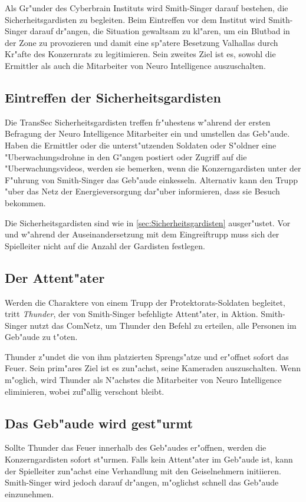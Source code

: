 Als Gr"under des Cyberbrain Instituts wird Smith-Singer darauf bestehen, die Sicherheitsgardisten zu begleiten. Beim Eintreffen vor dem Institut wird Smith-Singer darauf dr"angen, die Situation gewaltsam zu kl"aren, um ein Blutbad in der Zone zu provozieren und damit eine sp"atere Besetzung Valhallas durch Kr"afte des Konzernrats zu legitimieren. Sein zweites Ziel ist es, sowohl die Ermittler als auch die Mitarbeiter von Neuro Intelligence auszuschalten.

\subsection{Eintreffen der Sicherheitsgardisten} 
Die TransSec Sicherheitsgardisten treffen fr"uhestens w"ahrend der ersten Befragung der Neuro Intelligence Mitarbeiter ein und umstellen das Geb"aude. Haben die Ermittler oder die unterst"utzenden Soldaten oder S"oldner eine "Uberwachungsdrohne in den G"angen postiert oder Zugriff auf die "Uberwachungsvideos, werden sie bemerken, wenn die Konzerngardisten unter der F"uhrung von Smith-Singer das Geb"aude einkesseln. Alternativ kann \xl{} den Trupp "uber das Netz der Energieversorgung dar"uber informieren, dass sie Besuch bekommen.

Die Sicherheitsgardisten sind wie in \cref{sec:Sicherheitsgardisten} ausger"ustet. Vor und w"ahrend der Auseinandersetzung mit dem Eingreiftrupp muss sich der Spielleiter nicht auf die Anzahl der Gardisten festlegen.

\subsection{Der Attent"ater} 
Werden die Charaktere von einem Trupp der Protektorats-Soldaten begleitet, tritt \emph{Thunder}, der von Smith-Singer befehligte Attent"ater, in Aktion. Smith-Singer nutzt das ComNetz, um Thunder den Befehl zu erteilen, alle Personen im Geb"aude zu t"oten.

Thunder z"undet die von ihm platzierten Sprengs"atze und er"offnet sofort das Feuer. Sein prim"ares Ziel ist es zun"achst, seine Kameraden auszuschalten. Wenn m"oglich, wird Thunder als N"achstes die Mitarbeiter von Neuro Intelligence eliminieren, wobei \ml{} zuf"allig verschont bleibt.

\subsection{Das Geb"aude wird gest"urmt} 
Sollte Thunder das Feuer innerhalb des Geb"audes er"offnen, werden die Konzerngardisten sofort st"urmen. Falls kein Attent"ater im Geb"aude ist, kann der Spielleiter zun"achst eine Verhandlung mit den Geiselnehmern initiieren. Smith-Singer wird jedoch darauf dr"angen, m"oglichst schnell das Geb"aude einzunehmen.

